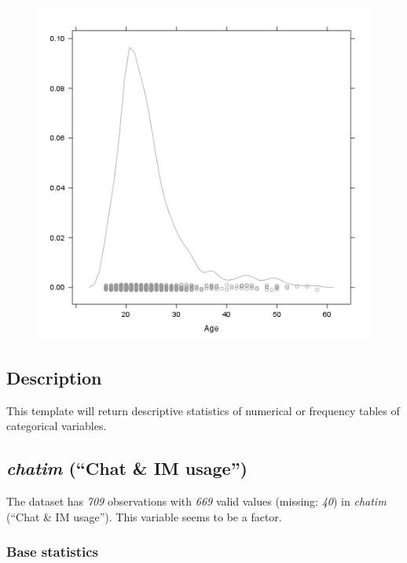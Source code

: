 \documentclass{article}
\makeatletter
\def\maxwidth{\ifdim\Gin@nat@width>\linewidth\linewidth
\else\Gin@nat@width\fi}
\let\Oldincludegraphics\includegraphics
\renewcommand{\includegraphics}[1]{\Oldincludegraphics[width=\maxwidth]{#1}}
\makeatother
\begin{document}
\begin{figure}[htbp]
\centering
\includegraphics{6fd0494eea748495baa80653752f194f.png}
\caption{}
\end{figure}

\subsection{Description}

This template will return descriptive statistics of numerical or
frequency tables of categorical variables.

\subsection{\emph{chatim} (``Chat \& IM usage'')}

The dataset has \emph{709} observations with \emph{669} valid values
(missing: \emph{40}) in \emph{chatim} (``Chat \& IM usage''). This
variable seems to be a factor.

\subsubsection{Base statistics}
\end{document}

